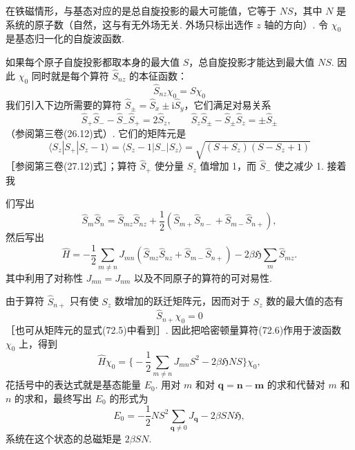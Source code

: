 在铁磁情形，与基态对应的是总自旋投影的最大可能值，它等于 $NS$，其中 $N$ 是系统的原子数（自然，这与有无外场无关. 外场只标出选作 $z$ 轴的方向）. 令 $\chi_0$ 是基态归一化的自旋波函数.

如果每个原子自旋投影都取本身的最大值 $S$，总自旋投影才能达到最大值 $NS$. 因此 $\chi_0$ 同时就是每个算符 $\hat{S}_{nz}$ 的本征函数：
\begin{equation}
\hat{S}_{nz}\chi_0=S\chi_0
\end{equation}
我们引入下边所需要的算符 $\hat{S}_{\pm}=\hat{S}_x\pm\mathrm{i}\hat{S}_y$，它们满足对易关系
\begin{equation}
\hat{S}_{+}\hat{S}_{-}-\hat{S}_{-}\hat{S}_{+}=2\hat{S}_z,\qquad
\hat{S}_z\hat{S}_{\pm}-\hat{S}_{\pm}\hat{S}_z=\pm\hat{S}_{\pm}
\end{equation}
（参阅第三卷(26.12)式）. 它们的矩阵元是
\begin{equation}
\langle S_z|S_{+}|S_z-1\rangle=\langle S_z-1|S_{-}|S_z\rangle
=\sqrt{(S+S_z)(S-S_z+1)}
\end{equation}
［参阅第三卷(27.12)式］；算符 $\hat{S}_{+}$ 使分量 $S_z$ 值增加 1，而 $\hat{S}_{-}$ 使之减少 1. 接着我

们写出
\begin{equation*}
\hat{S}_m\hat{S}_n=\hat{S}_{mz}\hat{S}_{nz}
+\frac{1}{2}(\hat{S}_{m+}\hat{S}_{n-}+\hat{S}_{m-}\hat{S}_{n+}),
\end{equation*}
然后写出
\begin{equation}
\hat{H}=-\frac{1}{2}\sum_{m\neq n}J_{mn}
(\hat{S}_{mz}\hat{S}_{nz}+\hat{S}_{m-}\hat{S}_{n+})
-2\beta\mathfrak{H}\sum_m\hat{S}_{mz}.
\end{equation}
其中利用了对称性 $J_{mn}=J_{nm}$ 以及不同原子的算符的可对易性.

由于算符 $\hat{S}_{n+}$ 只有使 $S_z$ 数增加的跃迁矩阵元，因而对于 $S_z$ 数的最大值的态有
\begin{equation}
\hat{S}_{n+}\chi_0=0
\end{equation}
［也可从矩阵元的显式(72.5)中看到］. 因此把哈密顿量算符(72.6)作用于波函数 $\chi_0$ 上，得到
\begin{equation*}
\hat{H}\chi_0=\biggl\{-\frac{1}{2}\sum_{m\neq n}J_{mn}S^2
-2\beta\mathfrak{H}NS\biggr\}\chi_0,
\end{equation*}
花括号中的表达式就是基态能量 $E_0$. 用对 $m$ 和对 $\bm{q}=\bm{n}-\bm{m}$ 的求和代替对 $m$ 和 $n$ 的求和，最终写出 $E_0$ 的形式为
\begin{equation}
E_0=-\frac{1}{2}NS^2\sum_{\bm{q}\neq0}J_{\bm{q}}-2\beta SN\mathfrak{H},
\end{equation}
系统在这个状态的总磁矩是 $2\beta SN$.

